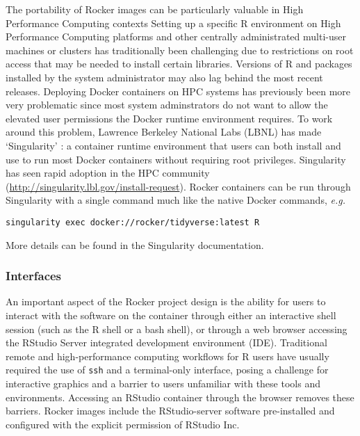 The portability of Rocker images can be particularly valuable in High
Performance Computing contexts Setting up a specific R environment on
High Performance Computing platforms and other centrally administrated
multi-user machines or clusters has traditionally been challenging due
to restrictions on root access that may be needed to install certain
libraries. Versions of R and packages installed by the system
administrator may also lag behind the most recent releases. Deploying
Docker containers on HPC systems has previously been more very
problematic since most system adminstrators do not want to allow the
elevated user permissions the Docker runtime environment requires. To
work around this problem, Lawrence Berkeley National Labs (LBNL) has
made `Singularity' \citep{singularity}: a container runtime environment
that users can both install and use to run most Docker containers
without requiring root privileges. Singularity has seen rapid adoption
in the HPC community (\url{http://singularity.lbl.gov/install-request}).
Rocker containers can be run through Singularity with a single command
much like the native Docker commands, \emph{e.g.}

\begin{verbatim}
singularity exec docker://rocker/tidyverse:latest R
\end{verbatim}

More details can be found in the Singularity documentation.

\subsubsection{Interfaces}\label{interfaces}

An important aspect of the Rocker project design is the ability for
users to interact with the software on the container through either an
interactive shell session (such as the R shell or a bash shell), or
through a web browser accessing the
RStudio\textsuperscript{\textregistered} Server integrated development
environment (IDE). Traditional remote and high-performance computing
workflows for R users have usually required the use of \texttt{ssh} and
a terminal-only interface, posing a challenge for interactive graphics
and a barrier to users unfamiliar with these tools and environments.
Accessing an RStudio\textsuperscript{\textregistered} container through
the browser removes these barriers. Rocker images include the
RStudio-server software pre-installed and configured with the explicit
permission of RStudio\textsuperscript{\textregistered} Inc.

